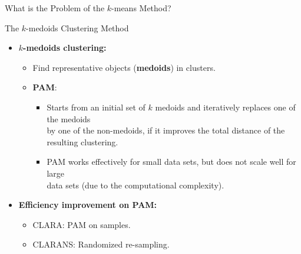 \begin{frame}{What is the Problem of the $k$-means Method?}
\end{frame}

\begin{frame}{The $k$-medoids Clustering Method}
	\begin{itemize}
		\item \textbf{$k$-medoids clustering:}
		      \begin{itemize}
			      \item Find representative objects (\textbf{\color{airforceblue}medoids}) in clusters.
			      \item \textbf{PAM}:
			            \begin{itemize}
				            \item Starts from an initial set of $k$ medoids and iteratively
				                  replaces one of the medoids \\
				                  by one of the non-medoids, if it improves the total distance of
				                  the resulting clustering.
				            \item PAM works effectively for small data sets, but does not
				                  scale well for large\\
				                  data sets (due to the computational complexity).
			            \end{itemize}
		      \end{itemize}
		\item \textbf{Efficiency improvement on PAM:}
		      \begin{itemize}
			      \item CLARA: PAM on samples.
			      \item CLARANS: Randomized re-sampling.
		      \end{itemize}
	\end{itemize}
\end{frame}

